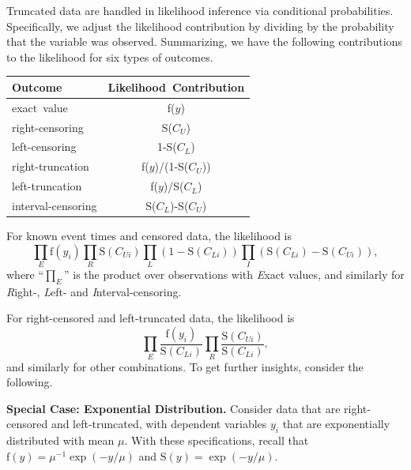 Truncated data are handled in likelihood inference via conditional probabilities.
Specifically, we adjust the likelihood contribution by dividing by the probability
that the variable was observed. Summarizing, we
have the following contributions to the likelihood for six types of
outcomes.
\begin{center}
\begin{tabular}{lc}
\hline Outcome            & Likelihood~Contribution \\\hline
exact~value        & f($y$) \\
right-censoring    & S($C_U$) \\
left-censoring     & 1-S($C_L$) \\
right-truncation   & f($y$)/(1-S($C_U$)) \\
left-truncation    & f($y$)/S($C_L$) \\
interval-censoring & S($C_L$)-S($C_U$) \\
\hline
\end{tabular}
\end{center}

For known event times and censored data, the likelihood is
\begin{equation*}
\prod_{E} \mathrm{f}(y_i) \prod_{R} \mathrm{S}(C_{Ui}) \prod_{L}
(1-\mathrm{S}(C_{Li})) \prod_{I}
(\mathrm{S}(C_{Li})-\mathrm{S}(C_{Ui})),
\end{equation*}
where ``$\prod_{E}$'' is the product over observations with
\textit{E}xact values, and similarly for \textit{R}ight-,
\textit{L}eft- and \textit{I}nterval-censoring.

For right-censored and left-truncated data, the likelihood is
\begin{equation*}
\prod_{E} \frac{\mathrm{f}(y_i)}{\mathrm{S}(C_{Li})} \prod_{R}
\frac{\mathrm{S}(C_{Ui})}{\mathrm{S}(C_{Li})} ,
\end{equation*}
and similarly for other combinations. To get further insights,
consider the following.

\linejed{}

\textbf{Special Case: Exponential Distribution.} Consider data that
are right-censored and left-truncated, with dependent variables
$y_i$ that are exponentially distributed with mean $\mu$. With these
specifications, recall that $\mathrm{f}(y) = \mu^{-1} \exp(-y/\mu)$
and $\mathrm{S}(y) = \exp(-y/\mu)$.

